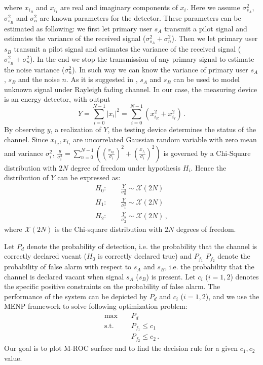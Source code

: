 where $x_{i_R}$ and $x_{i_I}$ are real and imaginary components of $x_i$.
Here we assume $\sigma_{s_A}^2$, $\sigma_{s_B}^2$ and $\sigma_n^2$  are known parameters for the detector. These parameters can be estimated as following: we first let primary user $s_A$ transmit a pilot signal and estimates the variance of the received signal ($\sigma_{s_A}^2 + \sigma_n^2$). Then we let primary user $s_B$ transmit a pilot signal and estimates the variance of the received signal ($\sigma_{s_B}^2 + \sigma_n^2$). In the end we stop the transmission of any primary signal to estimate the noise variance ($\sigma_n^2$). In such way we can know the variance of primary user $s_A$, $s_B$ and the noise $n$. As it is suggested in \cite{digham2007energy, sofotasios2015energy}, $s_A$ and $s_B$ can be used to model unknown signal under Rayleigh fading channel. 
In our case, the measuring device is an energy detector, with output 
\begin{equation} 
  Y = \sum_{i=0}^{N-1}|x_i|^2 = \sum_{i=0}^{N-1}(x_{i_R}^2+x_{i_I}^2)\,.
  \label{equ: testing device}
\end{equation}
By observing $y$, a realization of $Y$, the testing device determines the status of the channel. 
Since $x_{i_R}, x_{i_I}$ are uncorrelated Gaussian random variable with zero mean and variance $\sigma_i^2$, $\frac{y}{\sigma_i^2} = \sum_{n=0}^{N-1}((\frac{x_{i_R}}{\sigma_i})^2 + (\frac{x_{I_i}}{\sigma_i})^2)$ is governed by a Chi-Square distribution with $2N$ degree of freedom under hypothesis $H_i$.
Hence the distribution of $Y$ can be expressed as:
\begin{equation} 
  \label{equ: abstract}
  \begin{split}
	H_0:\;\;\;\;&\frac{Y}{\sigma_0^2}\sim \mathcal{X}(2N)\\
	H_1:\;\;\;\;&\frac{Y}{\sigma_1^2}\sim \mathcal{X}(2N)\\
	H_2:\;\;\;\;&\frac{Y}{\sigma_2^2}\sim \mathcal{X}(2N)\,,
  \end{split}
\end{equation}
where $\mathcal{X}(2N)$ is the Chi-square distribution with $2N$ degrees of freedom. 

Let $P_d$ denote the probability of detection, i.e. the probability that the channel is correctly declared vacant ($H_0$ is correctly declared true) and $P_{f_1}$ $P_{f_2}$ denote the probability of false alarm with respect to $s_A$  and $s_B$, i.e. the probability that the channel is declared vacant when signal $s_A$ ($s_B$) is present. Let $c_i$ ($i = 1, 2$) denotes the specific positive constraints on the probability of false alarm. The performance of the system can be depicted by $P_d$ and $c_i$ ($i = 1, 2$), and we use the MENP framework to solve following optimization problem:
\begin{equation}
  \begin{split}
	\max\;\;\;\;&P_d\\
	\text{s.t.}\;\;\;\;&P_{f_1}\leq c_1\\
	&P_{f_2} \leq c_2\,.
  \end{split}
  \label{1129a3}
\end{equation}
Our goal is to plot M-ROC surface and to find the decision rule for a given $c_1, c_2$ value.

